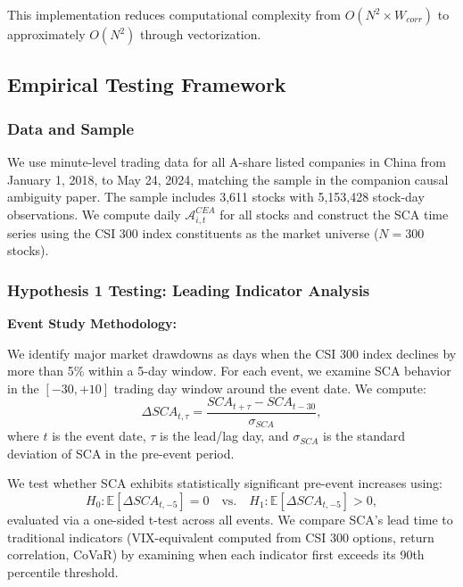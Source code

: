 \documentclass[preprint,12pt,authoryear]{elsarticle}
\begin{document}
This implementation reduces computational complexity from $O(N^2 \times W_{corr})$ to approximately $O(N^2)$ through vectorization.

\subsection{Empirical Testing Framework}

\subsubsection{Data and Sample}

We use minute-level trading data for all A-share listed companies in China from January 1, 2018, to May 24, 2024, matching the sample in the companion causal ambiguity paper. The sample includes 3,611 stocks with 5,153,428 stock-day observations. We compute daily $\mathcal{A}^{CEA}_{i,t}$ for all stocks and construct the SCA time series using the CSI 300 index constituents as the market universe ($N = 300$ stocks).

\subsubsection{Hypothesis 1 Testing: Leading Indicator Analysis}

\noindent
\textbf{Event Study Methodology:}

We identify major market drawdowns as days when the CSI 300 index declines by more than 5\% within a 5-day window. For each event, we examine SCA behavior in the $[-30, +10]$ trading day window around the event date. We compute:
\begin{equation}
\Delta SCA_{t,\tau} = \frac{SCA_{t+\tau} - SCA_{t-30}}{\sigma_{SCA}},
\end{equation}
where $t$ is the event date, $\tau$ is the lead/lag day, and $\sigma_{SCA}$ is the standard deviation of SCA in the pre-event period.

We test whether SCA exhibits statistically significant pre-event increases using:
\begin{equation}
H_0: \mathbb{E}[\Delta SCA_{t,-5}] = 0 \quad \text{vs.} \quad H_1: \mathbb{E}[\Delta SCA_{t,-5}] > 0,
\end{equation}
evaluated via a one-sided t-test across all events. We compare SCA's lead time to traditional indicators (VIX-equivalent computed from CSI 300 options, return correlation, CoVaR) by examining when each indicator first exceeds its 90th percentile threshold.
\end{document}
